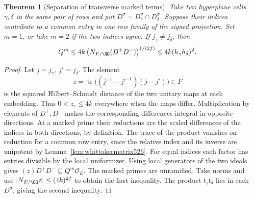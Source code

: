 \documentclass[a4paper,11pt]{article}
\newtheorem{theorem}[proposition]{Theorem}
\theoremstyle{definition}
\theoremstyle{remark}
\numberwithin{equation}{section}
\begin{document}
\begin{theorem}[Separation of transverse marked terms]
\leavevmode\label{thm:transverseseparate581}
Take two hyperplane cells \(\gamma,\delta\) in the same pair
of rows and put \(D^\sigma=D_\gamma^\sigma\cap D_\delta^\sigma\).
Suppose their indices contribute to a common entry in one row
family of the signed projection. Set \(m=1\), or take \(m=2\)
if the two indices agree. If \(j_\gamma\ne j_\delta\), then
\[
 Q^m\le 4k\,\bigl(N_{E/\QQ}(D^+D^-)\bigr)^{1/(2f)}
                  \le 4k(h_\gamma h_\delta)^2 .
\]
\end{theorem}
\begin{proof}
Let \(j=j_\gamma,\ j'=j_\delta\). The element
\[
 z=\operatorname{tr}\bigl((j^{-1}-{j'}^{-1})(j-j')\bigr)\in F
\]
is the squared Hilbert--Schmidt distance of the two unitary maps
at each embedding. Thus \(0<z_\tau\le4k\) everywhere when
the maps differ. Multiplication by elements of \(D^+,D^-\)
makes the corresponding differences integral in opposite
directions. At a marked prime their reductions are the scaled
differences of the indices in both directions, by definition.
The trace of the product vanishes on reduction for a common
row entry, since the relative index and its inverse are
unipotent by Lemma~\ref{lem:whittakermatrix526}. For equal
indices each factor has entries divisible by the local
uniformizer. Using local generators of the two ideals gives
\((z)D^+D^-\subseteq Q^m\mathcal O_E\). The marked primes are
unramified. Take norms and use
\(\lvert N_{E/\QQ}z\rvert\le(4k)^{2f}\) to obtain the first
inequality. The product \(\mathfrak t_\gamma\mathfrak t_\delta\)
lies in each \(D^\sigma\), giving the second inequality.
\end{proof}
\end{document}
